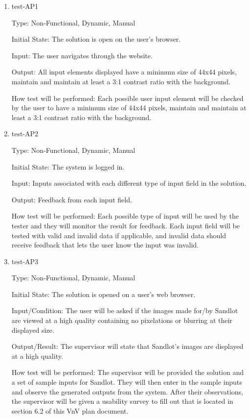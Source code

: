 \documentclass[12pt, titlepage]{article}
\begin{document}
\begin{enumerate}

  \item{test-AP1\\}

  Type: Non-Functional, Dynamic, Manual

  Initial State: The solution is open on the user's browser.

  Input: The user navigates through the website. 

  Output: All input elements displayed have a minimum size of 44x44 pixels, 
  maintain and maintain at least a 3:1 contrast ratio with the background.

  How test will be performed: Each possible user input element will be checked by 
  the user to have a minimum size of 44x44 pixels, maintain and maintain at 
  least a 3:1 contrast ratio with the background.

  \item{test-AP2\\}

  Type: Non-Functional, Dynamic, Manual

  Initial State: The system is logged in.

  Input: Inputs associated with each different type of input field in the
  solution.

  Output: Feedback from each input field.

  How test will be performed: Each possible type of input will be used by the
  tester and they will monitor the result for feedback. Each input field will
  be tested with valid and invalid data if applicable, and invalid data should
  receive feedback that lets the user know the input was invalid.

\item{test-AP3\\}

Type: Non-Functional, Dynamic, Manual

Initial State: The solution is opened on a user's web browser.

Input/Condition: The user will be asked if the images made for/by Sandlot are viewed at
a high quality containing no pixelations or blurring at their displayed size.

Output/Result: The supervisor will state that Sandlot's images are displayed at a high
quality.

How test will be performed: The supervisor will be provided the solution and a set of
sample inputs for Sandlot. They will then enter in the sample inputs and observe the
generated outputs from the system. After their observations, the supervisor will be given
a usability survey to fill out that is located in section 6.2 of this VnV plan document.


\end{enumerate}
\end{document}

